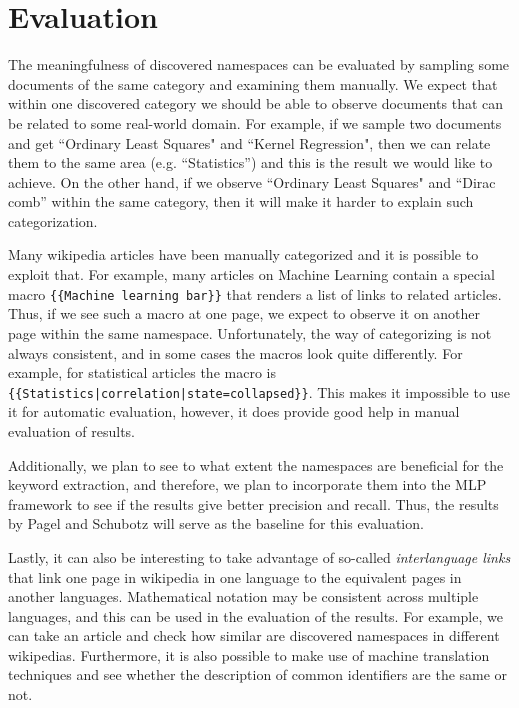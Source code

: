 
\section{Evaluation}


The meaningfulness of discovered namespaces can be evaluated by sampling some documents of the same category and examining them manually. We expect that within one discovered category we should be able to observe documents that can be related to some real-world domain. For example, if we sample two documents and get ``Ordinary Least Squares" and ``Kernel Regression", then we can relate them to the same area (e.g. ``Statistics'') and this is the result we would like to achieve. On the other hand, if we observe ``Ordinary Least Squares" and ``Dirac comb'' within the same category, then it will make it harder to explain such categorization.

Many wikipedia articles have been manually categorized and it is possible to exploit that. For example, many articles on Machine Learning contain a special macro \texttt{\{\{Machine learning bar\}\}} that renders a list of links to related articles. Thus, if we see such a macro at one page, we expect to observe it on another page within the same namespace. Unfortunately, the way of categorizing is not always consistent, and in some cases the macros look quite differently. For example, for statistical articles the macro is \texttt{\{\{Statistics|correlation|state=collapsed\}\}}. This makes it impossible to use it for automatic evaluation, however, it does provide good help in manual evaluation of results.


Additionally, we plan to see to what extent the namespaces are beneficial for the keyword extraction, and therefore, we plan to incorporate them into the MLP framework \cite{pagael2014mlp} to see if the results give better precision and recall. Thus, the results by Pagel and Schubotz \cite{pagael2014mlp} will serve as the baseline for this evaluation.


Lastly, it can also be interesting to take advantage of so-called \emph{interlanguage links} that link one page in wikipedia in one language to the equivalent pages in another languages. Mathematical notation may be consistent across multiple languages, and this can be used in the evaluation of the results. For example, we can take an article and check how similar are discovered namespaces in different wikipedias. Furthermore, it is also possible to make use of machine translation techniques and see whether the description of common identifiers are the same or not.
